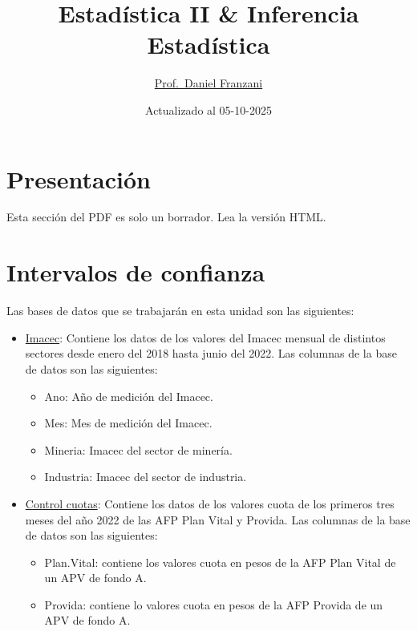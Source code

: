 \documentclass[
  11pt,
]{book}
\title{Estadística II \& Inferencia Estadística}
\author{\href{https://dfranzani.github.io/website/principal/home.html}{Prof.~Daniel Franzani}}
\date{Actualizado al 05-10-2025}
\providecommand{\tightlist}{%
  \setlength{\itemsep}{0pt}\setlength{\parskip}{0pt}}
\theoremstyle{definition}
\theoremstyle{definition}
\theoremstyle{definition}
\theoremstyle{definition}
\theoremstyle{remark}
\begin{document}
\maketitle

{
\setcounter{tocdepth}{3}
\tableofcontents
}
\chapter*{Presentación}\label{presentacion}

Esta sección del PDF es solo un borrador. Lea la versión HTML.

\chapter{Intervalos de confianza}\label{intervalos-de-confianza}

Las bases de datos que se trabajarán en esta unidad son las siguientes:

\begin{itemize}
\item
  \label{Imacec1}\href{https://raw.githubusercontent.com/Dfranzani/Bases-de-datos-para-cursos/main/2022-2/Estad\%C3\%ADstica\%201/imacec.csv}{Imacec}: Contiene los datos de los valores del Imacec mensual de distintos sectores desde enero del 2018 hasta junio del 2022. Las columnas de la base de datos son las siguientes:

  \begin{itemize}
  \tightlist
  \item
    Ano: Año de medición del Imacec.
  \item
    Mes: Mes de medición del Imacec.
  \item
    Mineria: Imacec del sector de minería.
  \item
    Industria: Imacec del sector de industria.
  \end{itemize}
\item
  \label{Cuotas}\href{https://raw.githubusercontent.com/Dfranzani/Bases-de-datos-para-cursos/main/2023-1/control\%2Bcuotas.csv}{Control cuotas}: Contiene los datos de los valores cuota de los primeros tres meses del año 2022 de las AFP Plan Vital y Provida. Las columnas de la base de datos son las siguientes:

  \begin{itemize}
  \tightlist
  \item
    Plan.Vital: contiene los valores cuota en pesos de la AFP Plan Vital de un APV de fondo A.
  \item
    Provida: contiene lo valores cuota en pesos de la AFP Provida de un APV de fondo A.
  \end{itemize}
\end{itemize}
\end{document}
